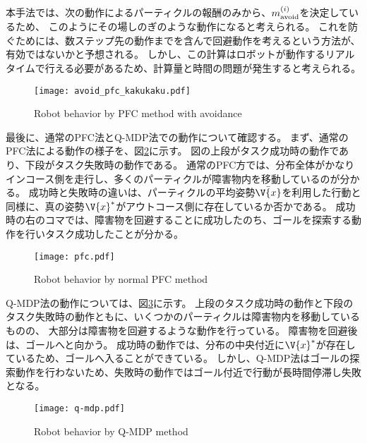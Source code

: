 本手法では、次の動作によるパーティクルの報酬のみから、$m^{(i)}_{\rm avoid}$を決定しているため、
このようにその場しのぎのような動作になると考えられる。
これを防ぐためには、数ステップ先の動作までを含んで回避動作を考えるという方法が、有効ではないかと予想される。
しかし、この計算はロボットが動作するリアルタイムで行える必要があるため、計算量と時間の問題が発生すると考えられる。

\begin{figure}[H]
  \begin{center}
    \texttt{[image: avoid\_pfc\_kakukaku.pdf]}
    \caption{Robot behavior by PFC method with avoidance}
    \label{fig:avoid pfc kakukaku}
  \end{center}
\end{figure}

最後に、通常のPFC法とQ-MDP法での動作について確認する。
まず、通常のPFC法による動作の様子を、図\ref{fig:pfc}に示す。
図の上段がタスク成功時の動作であり、下段がタスク失敗時の動作である。
通常のPFC方では、分布全体がかなりインコース側を走行し、多くのパーティクルが障害物内を移動しているのが分かる。
成功時と失敗時の違いは、パーティクルの平均姿勢$\bar{\V{x}}$を利用した行動と同様に、真の姿勢$\V{x}^{*}$がアウトコース側に存在しているか否かである。
成功時の右のコマでは、障害物を回避することに成功したのち、ゴールを探索する動作を行いタスク成功したことが分かる。

\begin{figure}[H]
  \begin{center}
    \texttt{[image: pfc.pdf]}
    \caption{Robot behavior by normal PFC method}
    \label{fig:pfc}
  \end{center}
\end{figure}

Q-MDP法の動作については、図\ref{fig:q-mdp}に示す。
上段のタスク成功時の動作と下段のタスク失敗時の動作ともに、いくつかのパーティクルは障害物内を移動しているものの、
大部分は障害物を回避するような動作を行っている。
障害物を回避後は、ゴールへと向かう。
成功時の動作では、分布の中央付近に$\V{x}^{*}$が存在しているため、ゴールへ入ることができている。
しかし、Q-MDP法はゴールの探索動作を行わないため、失敗時の動作ではゴール付近で行動が長時間停滞し失敗となる。

\begin{figure}[H]
  \begin{center}
    \texttt{[image: q-mdp.pdf]}
    \caption{Robot behavior by Q-MDP method}
    \label{fig:q-mdp}
  \end{center}
\end{figure}

